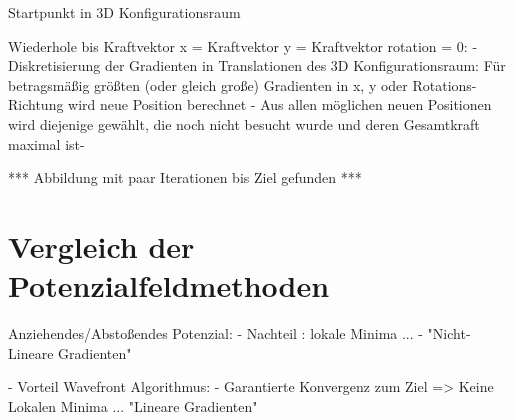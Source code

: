 Startpunkt in 3D Konfigurationsraum

Wiederhole bis Kraftvektor x = Kraftvektor y = Kraftvektor rotation = 0:
	- Diskretisierung der Gradienten in Translationen des 3D Konfigurationsraum: Für betragsmäßig größten (oder gleich große) Gradienten in x, y oder Rotations-Richtung wird neue Position berechnet
	- Aus allen möglichen neuen Positionen wird diejenige gewählt, die noch nicht besucht wurde und deren Gesamtkraft maximal ist-

*** Abbildung mit paar Iterationen bis Ziel gefunden ***


\section{Vergleich der Potenzialfeldmethoden}

Anziehendes/Abstoßendes Potenzial:
	- Nachteil : lokale Minima
	...
	- "Nicht-Lineare Gradienten"


- Vorteil Wavefront Algorithmus: 
	- Garantierte Konvergenz zum Ziel => Keine Lokalen Minima
	...
	"Lineare Gradienten"